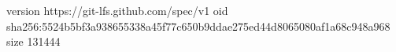 version https://git-lfs.github.com/spec/v1
oid sha256:5524b5bf3a938655338a45f77c650b9ddae275ed44d8065080af1a68c948a968
size 131444
